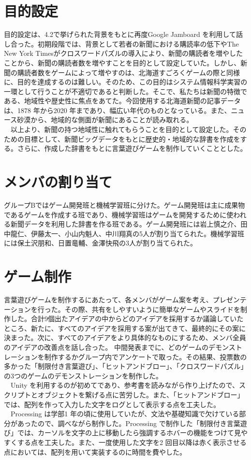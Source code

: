 \section{目的設定}
目的設定は、4.2で挙げられた背景をもとに再度Google Jamboard を利用して話し合った。初期段階では、背景として若者の新聞における購読率の低下やThe New York Timesがクロスワードパズルの導入により、新聞の購読者を増やしたことから、新聞の購読者数を増やすことを目的として設定していた。しかし、新聞の購読者数をゲームによって増やすのは、北海道すごろくゲームの際と同様に、目的を達成するのは難しい。そのため、この目的はシステム情報科学実習の一環として行うことが不適切であると判断した。そこで、私たちは新聞の特徴である、地域性や歴史性に焦点をあてた。今回使用する北海道新聞の記事データは、1878 年から2020 年まであり、幅広い年代のものとなっている。また、ニュース砂漠から、地域的な側面が新聞にあることが読み取れる。\\
　以上より、新聞の持つ地域性に触れてもらうことを目的として設定した。そのための目標として、新聞ビッグデータをもとに歴史的・地域的な辞書を作成をする。さらに、作成した辞書をもとに言葉遊びゲームを制作していくこととした。

\section{メンバの割り当て}
グループBではゲーム開発班と機械学習班に分けた。ゲーム開発班は主に成果物であるゲームを作成する班であり、機械学習班はゲームを開発するために使われる新聞データを利用した辞書を作る班である。ゲーム開発班には岩上慎之介、田中龍仁、伊藤太一、小山内魁人、中川翔真の5人が割り当てられた。機械学習班には保土沢朋和、日置竜輔、金澤快飛の3人が割り当てられた。

\section{ゲーム制作}
言葉遊びゲームを制作するにあたって、各メンバがゲーム案を考え、プレゼンテーションを行った。その際、共有をしやすいように簡単なゲームやスライドを制作した。合計9個出たアイデアの中からどのアイデアを採用するか議論していたところ、新たに、すべてのアイデアを採用する案が出てきて、最終的にその案に決まった。次に、すべてのアイデアをより具体的なものにするため、メンバ全員のアイデアの改善点を話し合った。
中間発表までに、どのゲームのデモンストレーションを制作するかグループ内でアンケートで取った。その結果、投票数の多かった「制限付き言葉遊び」、「ヒットアンドブロー」、「クロスワードパズル」の3つのゲームのデモンストレーションを制作した。\\
　Unity を利用するのが初めてであり、参考書を読みながら作り上げたので、スクリプトとオブジェクトを繋げる点に苦労した。また、「ヒットアンドブロー」では、配列を作って入力した文字をログとして表示する点を工夫した。\\
　Processing は学部1 年の頃に使用していたが、文法や基礎知識で欠けている部分があったので、調べながら制作した。Processing で制作した「制限付き言葉遊び」では、カーソルを文字の上に移動したら強調するホバーの機能をつけて見やすくする点を工夫した。また、一度使用した文字を2 回目以降は赤く表示させる点においては、配列を用いて実装するのに時間を費やした。

